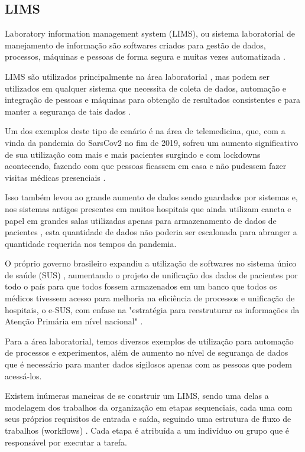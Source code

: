 \subsection{LIMS}


Laboratory information management system (LIMS), ou sistema laboratorial de manejamento de informação são softwares criados para gestão de dados, processos, máquinas e pessoas de forma segura e muitas vezes automatizada \cite{Stafford1998LIMS:Technology}.


LIMS são utilizados principalmente na área laboratorial \R, mas podem ser utilizados em qualquer sistema que necessita de coleta de dados, automação e integração de pessoas e máquinas para obtenção de resultados consistentes e para manter a segurança de tais dados \R.

Um dos exemplos deste tipo de cenário é na área de telemedicina, que, com a vinda da pandemia do SarsCov2 no fim de 2019, sofreu um aumento significativo de sua utilização com mais e mais pacientes surgindo e com lockdowns acontecendo, fazendo com que pessoas ficassem em casa e não pudessem fazer visitas médicas presenciais \R.

Isso também levou ao grande aumento de dados sendo guardados por sistemas e, nos sistemas antigos presentes em muitos hospitais que ainda utilizam caneta e papel em grandes salas utilizadas apenas para armazenamento de dados de pacientes \R, esta quantidade de dados não poderia ser escalonada para abranger a quantidade requerida nos tempos da pandemia.


O próprio governo brasileiro expandiu a utilização de softwares no sistema único de saúde (SUS) \R, aumentando o projeto de unificação dos dados de pacientes por todo o país para que todos fossem armazenados em um banco que todos os médicos tivessem acesso para melhoria na eficiência de processos e unificação de hospitais, o  e-SUS, com enfase na "estratégia para reestruturar as informações da Atenção Primária em nível nacional" \R.

Para a área laboratorial, temos diversos exemplos de utilização para automação de processos e experimentos, além de aumento no nível de segurança de dados que é necessário para manter dados sigilosos apenas com as pessoas que podem acessá-los. \NO

Existem inúmeras maneiras de se construir um LIMS, sendo uma delas a modelagem dos trabalhos da organização em etapas sequenciais, cada uma com seus próprios requisitos de entrada e saída, seguindo uma estrutura de fluxo de trabalhos (workflows) \R. Cada etapa é atribuída a um indivíduo ou grupo que é responsável por executar a tarefa.

